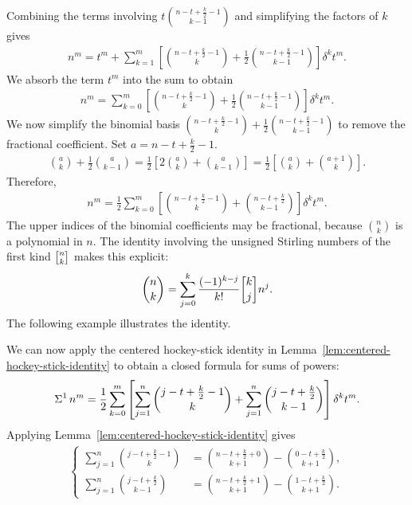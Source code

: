 Combining the terms involving $t\binom{n-t+\frac{k}{2}-1}{k-1}$ and simplifying the factors of $k$ gives
\begin{align*}
  n^m
  = t^m
  + \sum_{k=1}^{m}
  \left[
    \binom{n-t+\frac{k}{2}-1}{k}
    +
    \frac{1}{2}
    \binom{n-t+\frac{k}{2}-1}{k-1}
  \right] \delta^{k} t^m.
\end{align*}
We absorb the term $t^m$ into the sum to obtain
\begin{align*}
  n^m
  = \sum_{k=0}^{m}
  \left[
    \binom{n-t+\frac{k}{2}-1}{k}
    +
    \frac{1}{2}
    \binom{n-t+\frac{k}{2}-1}{k-1}
  \right] \delta^{k} t^m.
\end{align*}
We now simplify the binomial basis $\binom{n-t+\frac{k}{2}-1}{k}+\frac{1}{2}\binom{n-t+\frac{k}{2}-1}{k-1}$ to remove the fractional coefficient.
Set $a=n-t+\frac{k}{2}-1$.
\begin{align*}
  \binom{a}{k} + \frac{1}{2} \binom{a}{k-1}
  = \frac{1}{2}
  \left[
    2 \binom{a}{k} + \binom{a}{k-1}
  \right]
  = \frac{1}{2}
  \left[
    \binom{a}{k} + \binom{a+1}{k}
  \right].
\end{align*}
Therefore,
\begin{align*}
  n^m
  = \frac{1}{2}
  \sum_{k=0}^{m}
  \left[
    \binom{n-t+\frac{k}{2}-1}{k}
    +
    \binom{n-t+\frac{k}{2}}{k-1}
  \right] \delta^{k} t^m.
\end{align*}
The upper indices of the binomial coefficients may be fractional, because $\binom{n}{k}$ is a polynomial in $n$.
The identity involving the unsigned Stirling numbers of the first kind $\stirlingi{n}{k}$ makes this explicit:
\begin{align*}
  \binom{n}{k}
  = \sum_{j=0}^{k} \frac{(-1)^{k-j}}{k!} \stirlingi{k}{j} n^j.
\end{align*}
The following example illustrates the identity.

We can now apply the centered hockey-stick identity in Lemma~\eqref{lem:centered-hockey-stick-identity} to obtain a closed formula for sums of powers:
\begin{align*}
  \Sigma^{1}\,{n}^{m}
  = \frac{1}{2}
  \sum_{k=0}^{m}
  \left[
    \sum_{j=1}^{n} \binom{j-t+\frac{k}{2}-1}{k}
    +
    \sum_{j=1}^{n} \binom{j-t+\frac{k}{2}}{k-1}
  \right] \delta^{k} t^m.
\end{align*}
Applying Lemma~\eqref{lem:centered-hockey-stick-identity} gives
\begin{align*}
  \begin{cases}
    \sum_{j=1}^{n} \binom{j-t+\frac{k}{2}-1}{k} &= \binom{n -t + \frac{k}{2} +0}{k+1} - \binom{0 -t + \tfrac{k}{2}}{k+1}, \\
    \sum_{j=1}^{n} \binom{j-t+\frac{k}{2}}{k-1} &= \binom{n -t + \frac{k}{2} +1}{k+1} - \binom{1 -t + \tfrac{k}{2}}{k+1}.
  \end{cases}
\end{align*}
